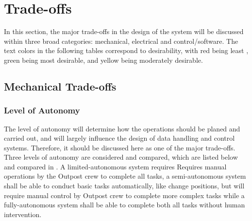 \documentclass[12pt, letterpaper]{article}
\begin{document}
\section{Trade-offs}
\label{sect:tradeoffs}
In this section, the major trade-offs in the design of the system will be discussed within three broad categories: mechanical, electrical and control/software. The text colors in the following tables correspond to desirability, with red being least , green being most desirable, and yellow being moderately desirable.
\subsection{Mechanical Trade-offs}
\subsubsection{Level of Autonomy}
The level of autonomy will determine how the operations should be planed and carried out, and will largely influence the design of data handling and control systems. Therefore, it should be discussed here as one of the major trade-offs. Three levels of autonomy are considered and compared, which are listed below and compared in . A limited-autonomous system requires Requires manual operations by the Outpost crew to complete all tasks, a semi-autonomous system shall be able to conduct basic tasks automatically, like change positions, but will require manual control by Outpost crew to complete more complex tasks while a fully-autonomous system shall be able to complete both all tasks without human intervention. 
\end{document}
